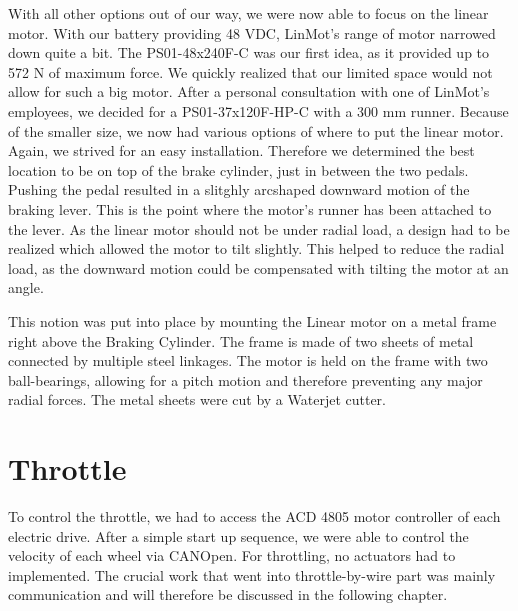 With all other options out of our way, we were now able to focus on the linear motor.
With our battery providing 48 VDC, LinMot's range of motor narrowed down quite a bit. The PS01-48x240F-C was our first idea, as it provided up to 572 N of maximum force. We quickly realized that our limited space would not allow for such a big motor. After a personal consultation with one of LinMot's employees, we decided for a PS01-37x120F-HP-C with a 300 mm runner. Because of the smaller size, we now had various options of where to put the linear motor. Again, we strived for an easy installation. Therefore we determined the best location to be on top of the brake cylinder, just in between the two pedals. Pushing the pedal resulted in a slitghly arcshaped downward motion of the braking lever. This is the point where the motor's runner has been attached to the lever. As the linear motor should not be under radial load, a design had to be realized which allowed the motor to tilt slightly. This helped to reduce the radial load, as the downward motion could be compensated with tilting the motor at an angle.

This notion was put into place by mounting the Linear motor on a metal frame right above the Braking Cylinder. The frame is made of two sheets of metal connected by multiple steel linkages. The motor is held on the frame with two ball-bearings, allowing for a pitch motion and therefore preventing any major radial forces.
The metal sheets were cut by a Waterjet cutter.





\section{Throttle}

To control the throttle, we had to access the ACD 4805 motor controller of each electric drive. After a simple start up sequence, we were able to control the velocity of each wheel via CANOpen. For throttling, no actuators had to implemented. The crucial work that went into throttle-by-wire part was mainly communication and will therefore be discussed in the following chapter.

